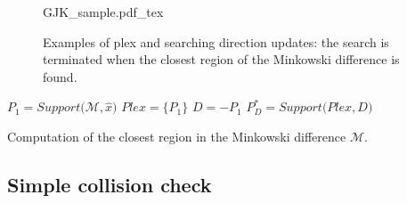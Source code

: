 \documentclass{article}
\begin{document}
\begin{figure}
	\centering
\def\svgwidth{0.95 \columnwidth}
{GJK_sample.pdf_tex} 
	\caption{Examples of plex and searching direction updates: the search is terminated when the closest region of the Minkowski difference is found. }
	\label{fig:GJK_sample}
\end{figure}

\begin{algorithm}[H]
$P_1 = Support \bigg(\mathcal{M} , \hat{x} \bigg)$\;
 $Plex = \lbrace P_1 \rbrace$\;
 $D = -P_1$\;
 $P^*_D=Support\bigg(Plex , D\bigg)$\;
\caption{Computation of the closest region in the Minkowski difference $\mathcal{M}$.
\label{alg:GJK_01}}
\end{algorithm}

\subsection{Simple collision check}
\end{document}
